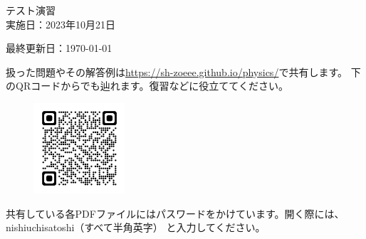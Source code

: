 \documentclass[a4paper,11pt]{jsarticle}
\begin{document}
\begin{titlepage}
  \begin{center}
    {\Huge\gt テスト演習}\\ \vspace{\baselineskip}
    \textup{\large 実施日：2023年10月21日}\\ 
  \end{center}
  \vfill
  \hfill {最終更新日：\today}
\end{titlepage}

\qPart

\calcPage

\qPart

\calcPage

\brankPage

\brankPage

扱った問題やその解答例は\url{https://sh-zoeee.github.io/physics/}で共有します。
下のQRコードからでも辿れます。復習などに役立ててください。
\begin{figure}[htbp]
  \centering
  \includegraphics[width=0.3\textwidth]{../graphs/qrcode.png}
\end{figure}

共有している各PDFファイルにはパスワードをかけています。開く際には、
nishiuchisatoshi（すべて半角英字）
と入力してください。
\end{document}

